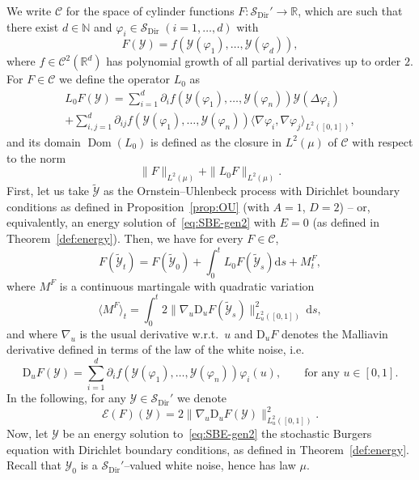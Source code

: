 \documentclass[AHL,Unicode,longabstracts]{cedram}
\DeclareMathOperator{\Dir}{Dir}
\DeclareMathOperator{\Dom}{Dom}
\newcommand{\bb}[1]{{\mathbb #1}}
\newcommand{\mc}[1]{{\mathcal #1}}
\renewcommand{\mc}[1]{{\mathcal #1}}
\newcommand{\SD}{\ensuremath{\mc S_{\Dir}}}
\renewcommand{\tilde}{\widetilde}
\newcommand*{\dd}{\mathrm{d}}
\newcommand*{\ds}{\dd s}
\begin{document}
We write $\mathcal{C}$ for the space of cylinder functions $F\colon \SD' \rightarrow \mathbb{R}$, which are such that there exist $d \in \bb N$ and $\varphi_i \in \SD \; (i=1,\dots,d)$ with
\[
F (\mc{Y})= f (\mc{Y} (\varphi_1),
\ldots, \mc{Y} (\varphi_d)),
\]
where $f \in \mc C^2 (\mathbb{R}^d)$ has polynomial growth of all partial derivatives up to order $2$. For $F \in \mathcal{C}$ we define the operator $L_0$ as
\begin{multline*}
L_0 F (\mc Y) = \sum_{i = 1}^d \partial_i f (\mc Y (\varphi_1), \ldots, \mc Y (\varphi_n)) \mc Y (\Delta \varphi_i) \\
+ \sum_{i, j = 1}^d \partial_{i j} f (\mc Y (\varphi_1), \ldots, \mc Y (\varphi_n)) \langle \nabla \varphi_i, \nabla
\varphi_j \rangle_{L^2 ([0, 1])},
\end{multline*}
and its domain $\Dom (L_0)$ is defined as the closure in $L^2(\mu)$ of $\mathcal{C}$ with respect to the norm
\[
\| F \|_{L^2 (\mu)} + \| L_0 F \|_{L^2 (\mu)}.
\]
First, let us take $\tilde{\mc Y}$ as the Ornstein--Uhlenbeck process with Dirichlet boundary conditions as defined in Proposition~\ref{prop:OU} (with $A=1$, $D=2$) -- or, equivalently, an energy solution of~\eqref{eq:SBE-gen2} with $E=0$ (as defined in Theorem~\ref{def:energy}). Then, we have for every $F \in \mathcal{C}$,
\[
F (\tilde{\mc Y}_t) = F (\tilde{\mc Y}_0) + \int_0^t L_0 F (\tilde{\mc Y}_s) \ds + M^F_t,
\]
where $M^F$ is a continuous martingale with quadratic variation
\[
\langle M^F \rangle_t = \int_0^t 2 \big\| \nabla_u \mathrm{D}_u F (\tilde{\mc Y}_s)
\big\|_{{L^2_u([0,1])}}^2 \,\ds,
\]
and where $\nabla_u$ is the usual derivative w.r.t.~$u$ and $\mathrm{D}_u F$ denotes the Malliavin derivative defined in terms of the law of the white noise, i.e.
\[
\mathrm{D}_u F (\mc Y)= \sum_{i = 1}^d \partial_i f (\mc Y (\varphi_1), \ldots, \mc Y (\varphi_n)) \varphi_i (u), \qquad \text{for any } u \in [0, 1].
\]
In the following, for any $\mc Y \in \SD'$ we denote
\begin{equation}\label{eq:E-def}
\mathcal{E} (F) (\mc Y)= 2 \big\| \nabla_u \mathrm{D}_u F (\mc Y)
\big\|_{{L^2_u([0,1])}}^2.
\end{equation}
Now, let $\mc Y$ be an energy solution to~\eqref{eq:SBE-gen2} the stochastic Burgers equation with Dirichlet boundary conditions, as defined in Theorem~\ref{def:energy}. Recall that $\mc Y_0$ is a $\SD'$--valued white noise, hence has law $\mu$.
\end{document}
